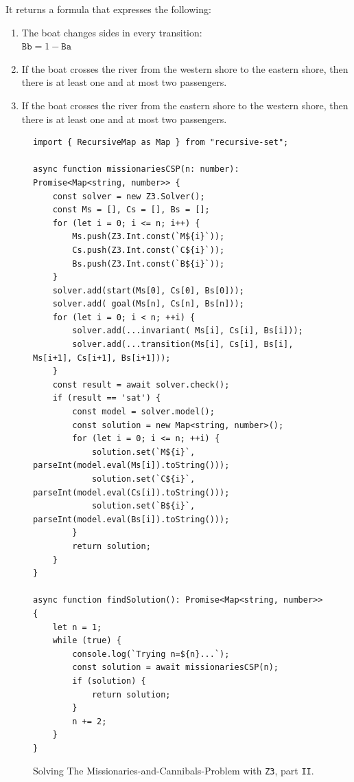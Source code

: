\begin{enumerate}
      It returns a formula that expresses the following:
      \begin{enumerate}
      \item The boat changes sides in every transition:
            \\[0.2cm]
            \hspace*{1.3cm}
            $\mathtt{Bb} = 1 - \mathtt{Ba}$
      \item If the boat crosses the river from the western shore to the eastern shore,
            then there is at least one and at most two passengers.
      \item If the boat crosses the river from the eastern shore to the western shore,
            then there is at least one and at most two passengers.
      \end{enumerate}
\end{enumerate}

\begin{figure}[!ht]
\centering
\begin{verbatim}
import { RecursiveMap as Map } from "recursive-set";

async function missionariesCSP(n: number): Promise<Map<string, number>> {
    const solver = new Z3.Solver();
    const Ms = [], Cs = [], Bs = [];
    for (let i = 0; i <= n; i++) {
        Ms.push(Z3.Int.const(`M${i}`));
        Cs.push(Z3.Int.const(`C${i}`));
        Bs.push(Z3.Int.const(`B${i}`));
    }
    solver.add(start(Ms[0], Cs[0], Bs[0]));
    solver.add( goal(Ms[n], Cs[n], Bs[n]));
    for (let i = 0; i < n; ++i) {
        solver.add(...invariant( Ms[i], Cs[i], Bs[i]));
        solver.add(...transition(Ms[i], Cs[i], Bs[i], Ms[i+1], Cs[i+1], Bs[i+1]));
    }
    const result = await solver.check();
    if (result == 'sat') {
        const model = solver.model();
        const solution = new Map<string, number>();
        for (let i = 0; i <= n; ++i) {
            solution.set(`M${i}`, parseInt(model.eval(Ms[i]).toString()));
            solution.set(`C${i}`, parseInt(model.eval(Cs[i]).toString()));
            solution.set(`B${i}`, parseInt(model.eval(Bs[i]).toString()));
        }
        return solution;
    } 
}

async function findSolution(): Promise<Map<string, number>> {
    let n = 1;
    while (true) {
        console.log(`Trying n=${n}...`);
        const solution = await missionariesCSP(n);
        if (solution) {
            return solution;
        }
        n += 2;
    }
}  
\end{verbatim}
\vspace*{-0.3cm}
\caption{Solving The Missionaries-and-Cannibals-Problem with \texttt{Z3}, part \texttt{II}.}
\label{fig:Missionaries-Z3.ipynb-2}
\end{figure} %

